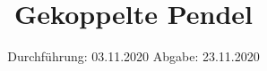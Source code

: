

\subject{V106}
\title{Gekoppelte Pendel}
\date{%
  Durchführung: 03.11.2020
  \hspace{3em}
  Abgabe: 23.11.2020
}



\maketitle
\thispagestyle{empty}
\tableofcontents
\newpage








\nocite{*}
\printbibliography{}

